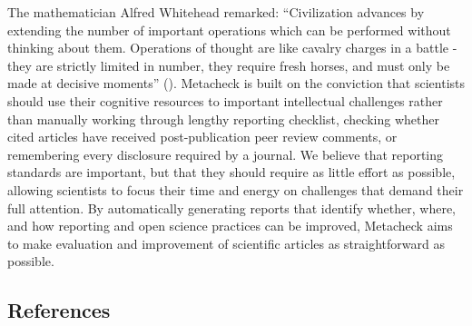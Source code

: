\documentclass[
  letterpaper,
  12pt]{article}
\begin{document}
The mathematician Alfred Whitehead remarked: ``Civilization advances by
extending the number of important operations which can be performed
without thinking about them. Operations of thought are like cavalry
charges in a battle - they are strictly limited in number, they require
fresh horses, and must only be made at decisive moments''
().
Metacheck is built on the conviction that scientists should use their
cognitive resources to important intellectual challenges rather than
manually working through lengthy reporting checklist, checking whether
cited articles have received post-publication peer review comments, or
remembering every disclosure required by a journal. We believe that
reporting standards are important, but that they should require as
little effort as possible, allowing scientists to focus their time and
energy on challenges that demand their full attention. By automatically
generating reports that identify whether, where, and how reporting and
open science practices can be improved, Metacheck aims to make
evaluation and improvement of scientific articles as straightforward as
possible.

\subsection{References}\label{references}
\end{document}

